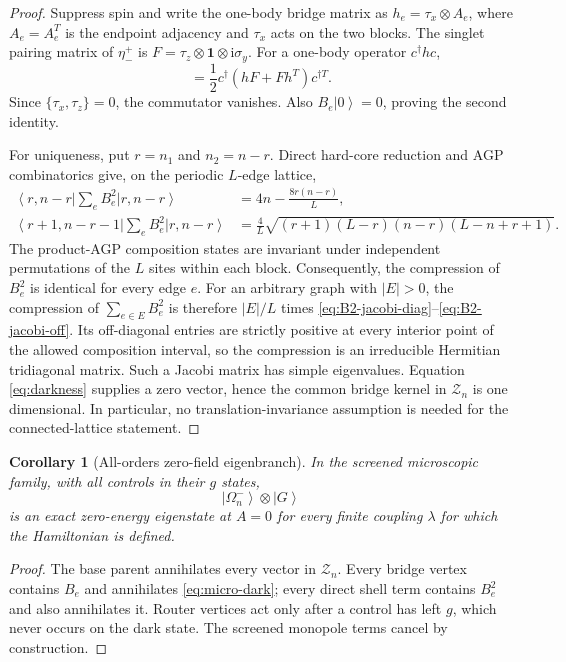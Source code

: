 \documentclass[11pt]{article}
\newtheorem{corollary}[theorem]{Corollary}
\theoremstyle{definition}
\theoremstyle{remark}
\newcommand{\cZ}{\mathcal Z}
\newcommand{\Id}{\mathbf 1}
\newcommand{\I}{\mathrm i}
\newcommand{\ket}[1]{\left|#1\right\rangle}
\newcommand{\bra}[1]{\left\langle#1\right|}
\begin{document}
\begin{proof}
Suppress spin and write the one-body bridge matrix as
$h_e=\tau_x\otimes A_e$, where $A_e=A_e^T$ is the endpoint adjacency and $\tau_x$ acts on the two blocks.  The singlet pairing matrix of $\eta_-^+$ is $F=\tau_z\otimes\Id\otimes\I\sigma_y$.  For a one-body operator $c^\dagger h c$,
\begin{equation}
 [c^\dagger hc,\eta_F^+]
 =\frac12c^\dagger(hF+Fh^T)c^{\dagger T}.
\end{equation}
Since $\{\tau_x,\tau_z\}=0$, the commutator vanishes.  Also $B_e\ket0=0$, proving the second identity.

For uniqueness, put $r=n_1$ and $n_2=n-r$.  Direct hard-core reduction and AGP combinatorics give, on the periodic $L$-edge lattice,
\begin{align}
 \bra{r,n-r}\sum_eB_e^2\ket{r,n-r}
 &=4n-\frac{8r(n-r)}{L},
 \label{eq:B2-jacobi-diag}\\
 \bra{r+1,n-r-1}\sum_eB_e^2\ket{r,n-r}
 &=\frac4L\sqrt{(r+1)(L-r)(n-r)(L-n+r+1)}.
 \label{eq:B2-jacobi-off}
\end{align}
The product-AGP composition states are invariant under independent permutations
of the $L$ sites within each block.  Consequently, the compression of $B_e^2$
is identical for every edge $e$.  For an arbitrary graph with $|E|>0$, the
compression of $\sum_{e\in E}B_e^2$ is therefore $|E|/L$ times
\eqref{eq:B2-jacobi-diag}--\eqref{eq:B2-jacobi-off}.  Its off-diagonal entries
are strictly positive at every interior point of the allowed composition
interval, so the compression is an irreducible Hermitian tridiagonal matrix.
Such a Jacobi matrix has simple eigenvalues.  Equation \eqref{eq:darkness}
supplies a zero vector, hence the common bridge kernel in $\cZ_n$ is one
dimensional.  In particular, no translation-invariance assumption is needed
for the connected-lattice statement.
\end{proof}

\begin{corollary}[All-orders zero-field eigenbranch]
\label{cor:allorders-dark}
In the screened microscopic family, with all controls in their $g$ states,
\begin{equation}
 \ket{\Omega_n^-}\otimes\ket G
 \label{eq:micro-dark}
\end{equation}
is an exact zero-energy eigenstate at $A=0$ for every finite coupling $\lambda$ for which the Hamiltonian is defined.
\end{corollary}

\begin{proof}
The base parent annihilates every vector in $\cZ_n$.  Every bridge vertex contains $B_e$ and annihilates \eqref{eq:micro-dark}; every direct shell term contains $B_e^2$ and also annihilates it.  Router vertices act only after a control has left $g$, which never occurs on the dark state.  The screened monopole terms cancel by construction.
\end{proof}
\end{document}
